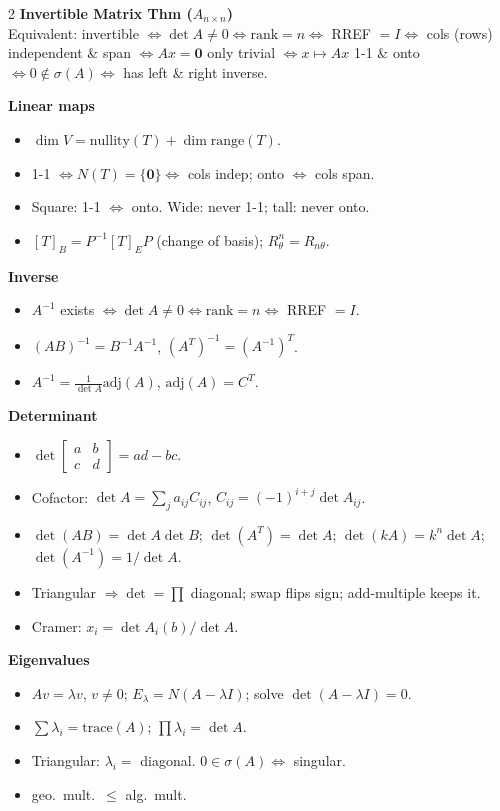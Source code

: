 \documentclass[hidelinks]{article}
\begin{document}
\begin{multicols}{2}
\textbf{\color{Thistle}Invertible Matrix Thm ($A_{n\times n}$)}\\
Equivalent: invertible $\iff\det A\neq0\iff\mathrm{rank}=n\iff$ RREF $=I\iff$ cols (rows) independent \& span $\iff Ax{=}\mathbf0$ only trivial $\iff x\mapsto Ax$ 1-1 \& onto $\iff 0\notin\sigma(A)\iff$ has left \& right inverse.

\textbf{\color{Thistle}Linear maps}
\begin{itemize}[leftmargin=1.1em,itemsep=1pt,topsep=1pt]
    \item $\dim V=\mathrm{nullity}(T)+\dim\mathrm{range}(T)$.
    \item 1-1 $\iff N(T)=\{\mathbf0\}\iff$ cols indep; onto $\iff$ cols span.
    \item Square: 1-1 $\iff$ onto. Wide: never 1-1; tall: never onto.
    \item $[T]_B=P^{-1}[T]_E P$ (change of basis); $R_\theta^n=R_{n\theta}$.
\end{itemize}

\textbf{\color{Thistle}Inverse}
\begin{itemize}[leftmargin=1.1em,itemsep=1pt,topsep=1pt]
    \item $A^{-1}$ exists $\iff \det A\neq 0 \iff \mathrm{rank}=n \iff$ RREF $=I$.
    \item $(AB)^{-1}=B^{-1}A^{-1}$, $(A^T)^{-1}=(A^{-1})^T$.
    \item $A^{-1}=\frac{1}{\det A}\mathrm{adj}(A)$, $\mathrm{adj}(A)=C^T$.
\end{itemize}

\textbf{\color{Thistle}Determinant}
\begin{itemize}[leftmargin=1.1em,itemsep=1pt,topsep=1pt]
    \item $\det\!\begin{bmatrix}a&b\\c&d\end{bmatrix}=ad-bc$.
    \item Cofactor: $\det A=\sum_j a_{ij}C_{ij}$, $C_{ij}=(-1)^{i+j}\det A_{ij}$.
    \item $\det(AB)=\det A\det B$; $\det(A^T)=\det A$; $\det(kA)=k^n\det A$; $\det(A^{-1})=1/\det A$.
    \item Triangular $\Rightarrow \det=\prod$ diagonal; swap flips sign; add-multiple keeps it.
    \item Cramer: $x_i=\det A_i(b)/\det A$.
\end{itemize}

\textbf{\color{Thistle}Eigenvalues}
\begin{itemize}[leftmargin=1.1em,itemsep=1pt,topsep=1pt]
    \item $Av=\lambda v$, $v\neq 0$; $E_\lambda=N(A-\lambda I)$; solve $\det(A-\lambda I)=0$.
    \item $\sum\lambda_i=\mathrm{trace}(A)$; $\prod\lambda_i=\det A$.
    \item Triangular: $\lambda_i=$ diagonal. $0\in\sigma(A)\iff$ singular.
    \item geo.\ mult.\ $\le$ alg.\ mult.
\end{itemize}


\end{multicols}
\end{document}
